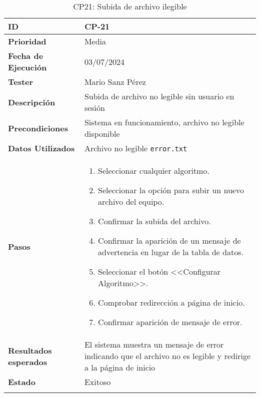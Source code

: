\begin{longtable}{>{\raggedright\arraybackslash}p{4cm} p{9.5cm}}
    \hline
    \rowcolor{gray!20}
    \textbf{ID} & CP-21\\
    \hline
    \rowcolor{white}
    \textbf{Prioridad} & Media \\
    \hline
    \rowcolor{gray!20}
    \textbf{Fecha de Ejecución} & 03/07/2024 \\
    \hline
    \rowcolor{white}
    \textbf{Tester} & Mario Sanz Pérez \\
    \hline
    \rowcolor{gray!20}
    \textbf{Descripción} & Subida de archivo no legible sin usuario en sesión\\
    \hline
    \rowcolor{white}
    \textbf{Precondiciones} & Sistema en funcionamiento, archivo no legible disponible\\
    \hline
    \rowcolor{white}
    \textbf{Datos Utilizados} & Archivo no legible \texttt{error.txt}\\
    \hline
    \rowcolor{gray!20}
    \textbf{Pasos} & \begin{enumerate}
        \item Seleccionar cualquier algoritmo.
        \item Seleccionar la opción para subir un nuevo archivo del equipo.
        \item Confirmar la subida del archivo.
        \item Confirmar la aparición de un mensaje de advertencia en lugar de la tabla de datos.
        \item Seleccionar el botón <<Configurar Algoritmo>>.
        \item Comprobar redirección a página de inicio.
        \item Confirmar aparición de mensaje de error.
    \end{enumerate}\\
    \rowcolor{gray!20}
    \textbf{Resultados esperados} & El sistema muestra un mensaje de error indicando que el archivo no es legible y redirige a la página de inicio\\
    \hline
    \hline
    \rowcolor{white}
    \textbf{Estado} & Exitoso\\
    \hline
	\caption[CP21: Subida de archivo ilegible]{CP21: Subida de archivo ilegible}
\end{longtable}

